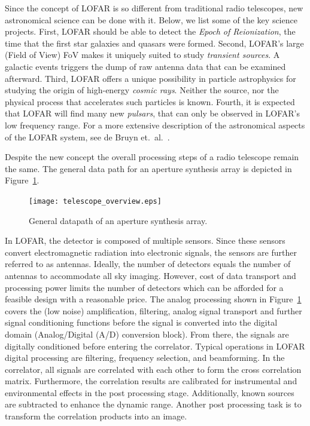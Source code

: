 \documentclass[journal]{IEEEtran}
\begin{document}
Since the concept of LOFAR is so different from traditional radio telescopes,
new astronomical science can be done with it.
Below, we list some of the key science projects.
First, LOFAR should be able to detect the {\em Epoch of Reionization},
the time that the first star galaxies and quasars were formed.
Second, LOFAR's large (Field of View) FoV makes it uniquely suited to study {\em transient
sources}.
A galactic events triggers the dump of raw antenna data that can be examined
afterward.
Third, LOFAR offers a unique possibility in particle astrophysics for
studying the origin of high-energy {\em cosmic rays}.
Neither the source, nor the physical process that accelerates such particles
is known.
Fourth, it is expected that LOFAR will find many new {\em pulsars}, that can
only be observed in LOFAR's low frequency range.
For a more extensive description of the astronomical aspects of the LOFAR
system, see de Bruyn et.~al.~\cite{Bruyn:02}.

Despite the new concept the overall processing steps of a radio telescope remain the same. The general data path for an aperture synthesis array is depicted in Figure~\ref{fig:concept}.

\begin{figure}
\begin{center}
\texttt{[image: telescope\_overview.eps]}
\end{center}
\caption{General datapath of an aperture synthesis array.}
\label{fig:concept}
\end{figure}

In LOFAR, the detector is composed of multiple sensors. Since these sensors convert electromagnetic radiation into electronic signals, the sensors are further referred to as antennas. Ideally, the number of detectors equals the number of antennas to accommodate all sky imaging. However, cost of data transport and processing power limits the number of detectors which can be afforded for a feasible design with a reasonable price. The analog processing shown in Figure~\ref{fig:concept} covers the (low noise) amplification, filtering, analog signal transport and further signal conditioning functions before the signal is converted into the digital domain (Analog/Digital (A/D) conversion block). From there, the signals are digitally conditioned before entering the correlator. Typical operations in LOFAR digital processing are filtering, frequency selection, and beamforming. In the correlator, all signals are correlated with each other to form the cross correlation matrix. Furthermore, the correlation results are calibrated for instrumental and environmental effects in the post processing stage. Additionally, known sources are subtracted to enhance the dynamic range. Another post processing task is to transform the correlation products into an image.
\end{document}
